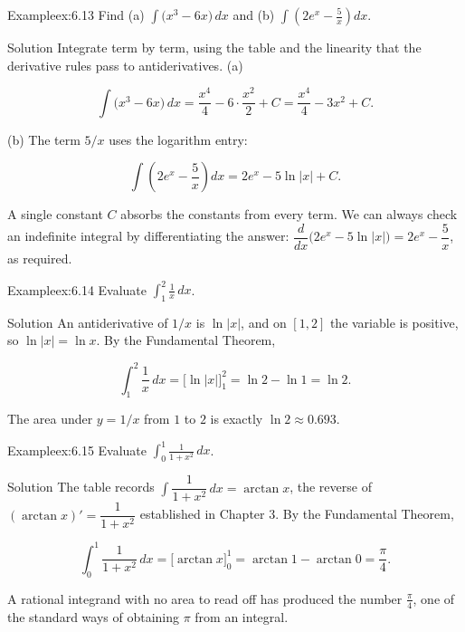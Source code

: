 \documentclass[a4paper,12pt,oneside]{memoir}
\begin{document}
\begin{workedexample}
\begin{envexample}{Example}{ex:6.13}{}
Find (a) \(\displaystyle\int \bigl(x^{3} - 6x\bigr)\,dx\) and (b) \(\displaystyle\int \left(2e^{x} - \frac{5}{x}\right)dx\).
\end{envexample}
\begin{envsolution}{Solution}{}{}
Integrate term by term, using the table and the linearity that the derivative rules pass to antiderivatives. (a)

\[ \int \bigl(x^{3} - 6x\bigr)\,dx = \frac{x^{4}}{4} - 6\cdot\frac{x^{2}}{2} + C = \frac{x^{4}}{4} - 3x^{2} + C. \]

(b) The term \(5/x\) uses the logarithm entry:

\[ \int \left(2e^{x} - \frac{5}{x}\right)dx = 2e^{x} - 5\ln\lvert x\rvert + C. \]

A single constant \(C\) absorbs the constants from every term. We can always check an indefinite integral by differentiating the answer: \(\dfrac{d}{dx}\bigl(2e^{x} - 5\ln\lvert x\rvert\bigr) = 2e^{x} - \dfrac{5}{x}\), as required. \qedmark
\end{envsolution}
\end{workedexample}
\begin{workedexample}
\begin{envexample}{Example}{ex:6.14}{}
Evaluate \(\displaystyle\int_{1}^{2} \frac{1}{x}\,dx\).
\end{envexample}
\begin{envsolution}{Solution}{}{}
An antiderivative of \(1/x\) is \(\ln\lvert x\rvert\), and on \([1, 2]\) the variable is positive, so \(\ln\lvert x\rvert = \ln x\). By the Fundamental Theorem,

\[ \int_{1}^{2} \frac{1}{x}\,dx = \bigl[\ln\lvert x\rvert\bigr]_{1}^{2} = \ln 2 - \ln 1 = \ln 2. \]

The area under \(y = 1/x\) from \(1\) to \(2\) is exactly \(\ln 2 \approx 0.693\). \qedmark
\end{envsolution}
\end{workedexample}
\begin{workedexample}
\begin{envexample}{Example}{ex:6.15}{}
Evaluate \(\displaystyle\int_{0}^{1} \frac{1}{1 + x^{2}}\,dx\).
\end{envexample}
\begin{envsolution}{Solution}{}{}
The table records \(\int \dfrac{1}{1 + x^{2}}\,dx = \arctan x\), the reverse of \((\arctan x)' = \dfrac{1}{1 + x^{2}}\) established in Chapter 3. By the Fundamental Theorem,

\[ \int_{0}^{1} \frac{1}{1 + x^{2}}\,dx = \bigl[\arctan x\bigr]_{0}^{1} = \arctan 1 - \arctan 0 = \frac{\pi}{4}. \]

A rational integrand with no area to read off has produced the number \(\tfrac{\pi}{4}\), one of the standard ways of obtaining \(\pi\) from an integral. \qedmark
\end{envsolution}
\end{workedexample}
\end{document}
